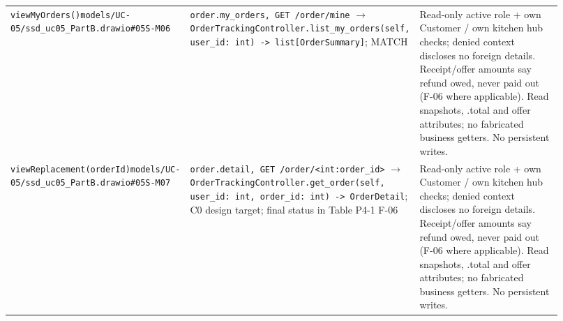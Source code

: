 \begin{longtable}{>{\raggedright\arraybackslash}p{0.3067\linewidth}>{\raggedright\arraybackslash}p{0.3067\linewidth}>{\raggedright\arraybackslash}p{0.3067\linewidth}}
\texttt{viewMyOrders()}\newline{}\texttt{models/\allowbreak{}UC-05/\allowbreak{}ssd\_\allowbreak{}uc05\_\allowbreak{}PartB.\allowbreak{}drawio\#05S-M06} & \texttt{order.\allowbreak{}my\_\allowbreak{}orders, GET /\allowbreak{}order/\allowbreak{}mine} \ensuremath{\rightarrow} \texttt{OrderTrackingController.\allowbreak{}list\_\allowbreak{}my\_\allowbreak{}orders(self, user\_\allowbreak{}id: int) -\textgreater{} list[OrderSummary]}; MATCH & Read-only active role + own Customer / own kitchen hub checks; denied context discloses no foreign details. Receipt/offer amounts say refund owed, never paid out (F-06 where applicable). Read snapshots, .total and offer attributes; no fabricated business getters. No persistent writes. \\
\texttt{viewReplacement(orderId)}\newline{}\texttt{models/\allowbreak{}UC-05/\allowbreak{}ssd\_\allowbreak{}uc05\_\allowbreak{}PartB.\allowbreak{}drawio\#05S-M07} & \texttt{order.\allowbreak{}detail, GET /\allowbreak{}order/\allowbreak{}\textless{}int:order\_\allowbreak{}id\textgreater{}} \ensuremath{\rightarrow} \texttt{OrderTrackingController.\allowbreak{}get\_\allowbreak{}order(self, user\_\allowbreak{}id: int, order\_\allowbreak{}id: int) -\textgreater{} OrderDetail}; C0 design target; final status in Table P4-1 F-06 & Read-only active role + own Customer / own kitchen hub checks; denied context discloses no foreign details. Receipt/offer amounts say refund owed, never paid out (F-06 where applicable). Read snapshots, .total and offer attributes; no fabricated business getters. No persistent writes. \\

\end{longtable}
